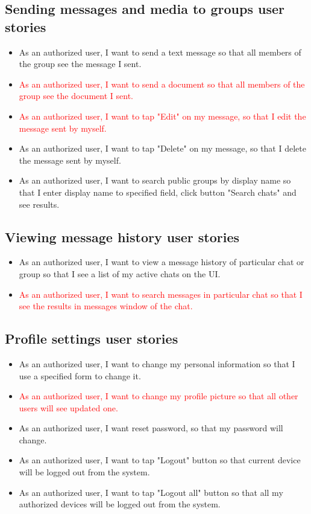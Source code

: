 \subsection{Sending messages and media to groups user stories}
\label{subsec:sending-messages-and-media-to-groups}
\begin{itemize}
    \item As an authorized user, I want to send a text message so that all members of the group see the message I sent.
    \item \textcolor{red}{As an authorized user, I want to send a document so that all members of the group see the document I sent.}
    \item \textcolor{red}{As an authorized user, I want to tap "Edit" on my message, so that I edit the message sent by myself.}
    \item As an authorized user, I want to tap "Delete" on my message, so that I delete the message sent by myself.
    \item As an authorized user, I want to search public groups by display name so that I enter display name to specified field, click button "Search chats" and see results.
\end{itemize}

\subsection{Viewing message history user stories}\label{subsec:viewing-message-history-feature-user-stories}
\begin{itemize}
    \item As an authorized user, I want to view a message history of particular chat or group so that I see a list of my active chats on the UI\@.
    \item \textcolor{red}{As an authorized user, I want to search messages in particular chat so that I see the results in messages window of the chat.}
\end{itemize}

\subsection{Profile settings user stories}\label{subsec:profile-settings-user-stories}
\begin{itemize}
    \item As an authorized user, I want to change my personal information so that I use a specified form to change it.
    \item \textcolor{red}{As an authorized user, I want to change my profile picture so that all other users will see updated one.}
    \item As an authorized user, I want reset password, so that my password will change.
    \item As an authorized user, I want to tap "Logout" button so that current device will be logged out from the system.
    \item As an authorized user, I want to tap "Logout all" button so that all my authorized devices will be logged out from the system.
\end{itemize}
